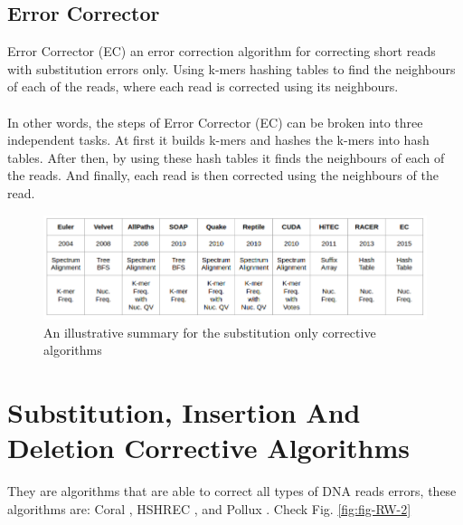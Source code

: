 \documentclass[12pt,openany]{llncs}
\begin{document}
\subsection{Error Corrector}
Error Corrector (EC) \cite{EC} an error correction algorithm for correcting short reads with substitution errors only. Using k-mers hashing tables to find the neighbours of each of the reads, where each read is corrected using its neighbours.
\\
\\
In other words, the steps of Error Corrector (EC) can be broken into three independent tasks. At first it builds k-mers and hashes the k-mers into hash tables. After then, by using these hash tables it finds the neighbours of each of the reads. And finally, each read is then corrected using the neighbours of the read.

\begin{figure}
	\centering
	\includegraphics[width=.951\linewidth]{./figs/RW-1}
	\caption{\label{fig:fig-RW-1}An illustrative summary for the substitution only corrective algorithms}
\end{figure}


\section{Substitution, Insertion And Deletion Corrective Algorithms}
They are algorithms that are able to correct all types of DNA reads errors, these algorithms are: Coral \cite{Coral}, HSHREC \cite{HShrec}, and Pollux \cite{Pollux}. Check Fig. \ref{fig:fig-RW-2}
\end{document}
